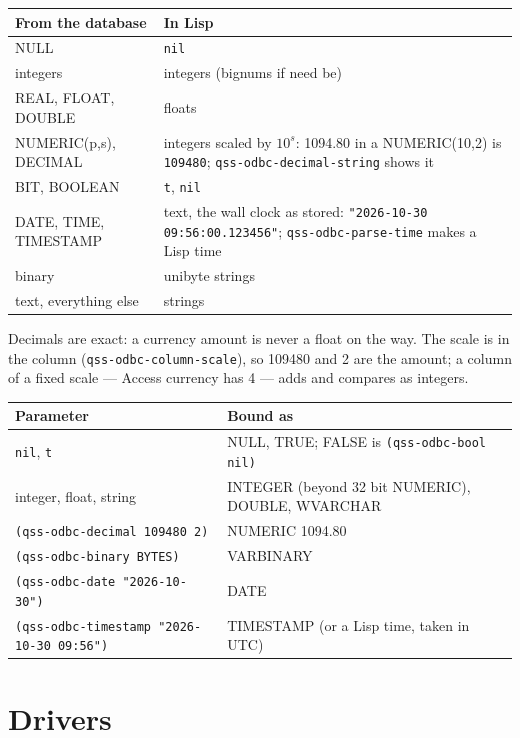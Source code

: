\documentclass[
  paper=a4, fontsize=11pt, parskip=half, headings=small,
  toc=bibliography, numbers=noenddot, DIV=12
]{scrreprt}
\newcommand{\code}[1]{\texttt{#1}}
\begin{document}
\noindent\begin{tabularx}{\linewidth}{@{}lX@{}}
\toprule
\textbf{From the database} & \textbf{In Lisp} \\
\midrule
NULL & \code{nil} \\
integers & integers (bignums if need be) \\
REAL, FLOAT, DOUBLE & floats \\
NUMERIC(p,s), DECIMAL & integers scaled by $10^s$: 1094.80 in a NUMERIC(10,2) is \code{109480}; \code{qss-odbc-decimal-string} shows it \\
BIT, BOOLEAN & \code{t}, \code{nil} \\
DATE, TIME, TIMESTAMP & text, the wall clock as stored: \code{"2026-10-30 09:56:00.123456"}; \code{qss-odbc-parse-time} makes a Lisp time \\
binary & unibyte strings \\
text, everything else & strings \\
\bottomrule
\end{tabularx}

\medskip
Decimals are exact: a currency amount is never a float on the way. The
scale is in the column (\code{qss-odbc-column-scale}), so 109480 and 2 are the
amount; a column of a fixed scale --- Access currency has 4 --- adds and
compares as integers.

\begin{tabularx}{\linewidth}{@{}lX@{}}
\toprule
\textbf{Parameter} & \textbf{Bound as} \\
\midrule
\code{nil}, \code{t} & NULL, TRUE; FALSE is \code{(qss-odbc-bool nil)} \\
integer, float, string & INTEGER (beyond 32 bit NUMERIC), DOUBLE, WVARCHAR \\
\code{(qss-odbc-decimal 109480 2)} & NUMERIC 1094.80 \\
\code{(qss-odbc-binary BYTES)} & VARBINARY \\
\code{(qss-odbc-date "2026-10-30")} & DATE \\
\code{(qss-odbc-timestamp "2026-10-30 09:56")} & TIMESTAMP (or a Lisp time, taken in UTC) \\
\bottomrule
\end{tabularx}

\chapter{Drivers}\label{chap:drivers}
\end{document}
